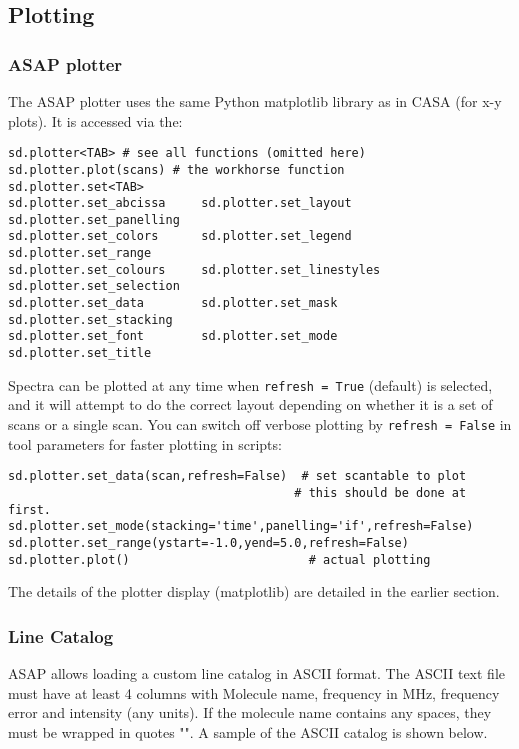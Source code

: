 \subsection{Plotting}
\label{subsection:sd.asap.plotting}

\subsubsection{ASAP plotter}
The ASAP plotter uses the same Python matplotlib library as in CASA
(for x-y plots). It is accessed via the: 

\small
\begin{verbatim}
sd.plotter<TAB> # see all functions (omitted here)
sd.plotter.plot(scans) # the workhorse function
sd.plotter.set<TAB>
sd.plotter.set_abcissa     sd.plotter.set_layout      sd.plotter.set_panelling
sd.plotter.set_colors      sd.plotter.set_legend      sd.plotter.set_range
sd.plotter.set_colours     sd.plotter.set_linestyles  sd.plotter.set_selection
sd.plotter.set_data        sd.plotter.set_mask        sd.plotter.set_stacking
sd.plotter.set_font        sd.plotter.set_mode        sd.plotter.set_title
\end{verbatim}
\normalsize

Spectra can be plotted at any time when {\tt refresh = True} (default) is
selected, and it will attempt to do the correct layout depending on
whether it is a set of scans or a single scan. 
You can switch off verbose plotting by {\tt refresh = False} in
tool parameters for faster plotting in scripts: 


\begin{verbatim}
sd.plotter.set_data(scan,refresh=False)  # set scantable to plot
                                        # this should be done at first.
sd.plotter.set_mode(stacking='time',panelling='if',refresh=False)
sd.plotter.set_range(ystart=-1.0,yend=5.0,refresh=False)
sd.plotter.plot()                         # actual plotting
\end{verbatim}

The details of the plotter display (matplotlib) are detailed in
the earlier section.

\subsubsection{Line Catalog}
ASAP allows loading a custom line catalog in ASCII format.
The ASCII text file must have at least 4 columns with Molecule name, 
frequency in MHz, frequency error and intensity (any units).
If the molecule name contains any spaces, they must be wrapped in quotes "".
A sample of the ASCII catalog is shown below.

